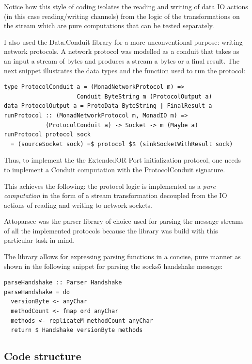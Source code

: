 \documentclass[11pt]{article} %
\begin{document}
Notice how this style of coding isolates the reading and writing of data IO actions (in this case reading/writing channels) from the logic of the transformations on the stream which are pure computations that can be tested separately.

I also used the Data.Conduit library for a more unconventional purpose: writing network protocols. A network protocol was modelled as a conduit that takes as an input a stream of bytes and produces a stream a bytes or a final result. The next snippet illustrates the data types and the function used to run the protocol:

\begin{lstlisting}
type ProtocolConduit a = (MonadNetworkProtocol m) =>
					 Conduit ByteString m (ProtocolOutput a)
data ProtocolOutput a = ProtoData ByteString | FinalResult a
runProtocol :: (MonadNetworkProtocol m, MonadIO m) =>
			(ProtocolConduit a) -> Socket -> m (Maybe a)
runProtocol protocol sock
  = (sourceSocket sock) =$ protocol $$ (sinkSocketWithResult sock)
\end{lstlisting}

Thus, to implement the the ExtendedOR Port initialization protocol, one needs to implement a Conduit computation with the ProtocolConduit signature.

This achieves the following: the protocol logic is implemented as a \textit{pure computation}  in the form of a stream transformation decoupled from the IO actions of reading and writing to network sockets.

Attoparsec was the parser library of choice used for parsing the message streams of all the implemented protocols because the library was build with this particular task in mind.

The library allows for expressing parsing functions in a concise, pure manner as shown in the following snippet for parsing the socks5 handshake message:

\begin{lstlisting}
parseHandshake :: Parser Handshake
parseHandshake = do
  versionByte <- anyChar
  methodCount <- fmap ord anyChar
  methods <- replicateM methodCount anyChar
  return $ Handshake versionByte methods
\end{lstlisting}

\subsection{Code structure}
\end{document}
